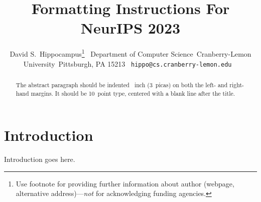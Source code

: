 \documentclass{article}
\title{Formatting Instructions For NeurIPS 2023}
\author{%
  David S.~Hippocampus\thanks{Use footnote for providing further information
    about author (webpage, alternative address)---\emph{not} for acknowledging
    funding agencies.} \
  Department of Computer Science\
  Cranberry-Lemon University\
  Pittsburgh, PA 15213 \
  \texttt{hippo@cs.cranberry-lemon.edu} \
}
\begin{document}
\maketitle

\begin{abstract}
  The abstract paragraph should be indented ~inch (3~picas) on
  both the left- and right-hand margins. It should be 10~point type, centered with a blank line after the title.
\end{abstract}

\section{Introduction}
Introduction goes here.
\end{document}
